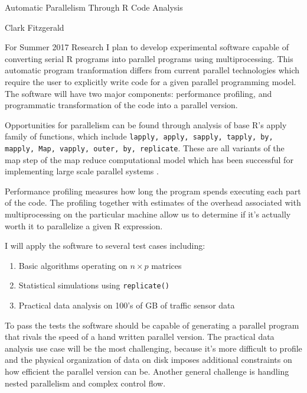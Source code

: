\documentclass[12pt]{article}
\begin{document}
\begin{center}
    \large Automatic Parallelism Through R Code Analysis 

    \normalsize Clark Fitzgerald
\end{center}

\vspace{3\baselineskip}

For Summer 2017 Research I plan to develop experimental software capable of
converting serial R programs into parallel programs using multiprocessing.
This automatic program tranformation differs from current parallel
technologies which require the user to explicitly write code for a given
parallel programming model. The software will have two major components:
performance profiling, and programmatic transformation of the code into a
parallel version.


Opportunities for parallelism can be found through analysis of base R's
apply family of functions, which include \texttt{lapply, apply, sapply,
tapply, by, mapply, Map, vapply, outer, by, replicate}. These are all
variants of the map step of the map reduce computational model which has
been successful for implementing large scale parallel systems
\cite{dean2008mapreduce}.

Performance profiling measures how long the program spends executing each
part of the code. The profiling together with estimates of the overhead
associated with multiprocessing on the particular machine allow us to
determine if it's actually worth it to parallelize a given R expression.

I will apply the software to several test cases including:
\begin{enumerate}
    \item Basic algorithms operating on $n \times p$ matrices
    \item Statistical simulations using \texttt{replicate()}
    \item Practical data analysis on 100's of GB of traffic sensor data 
\end{enumerate}
To pass the tests the software should be capable of generating a parallel
program that rivals the speed of a hand written parallel version. The
practical data analysis use case will be the most challenging, because it's
more difficult to profile and the physical organization of data on disk
imposes additional constraints on how efficient the parallel version can
be. Another general challenge is handling nested parallelism and complex
control flow.
\end{document}

